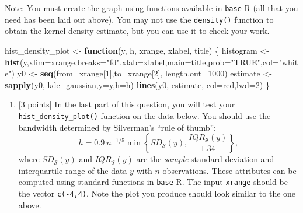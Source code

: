 \documentclass[
]{article}
\newenvironment{Shaded}{\begin{snugshade}}{\end{snugshade}}
\newcommand{\AttributeTok}[1]{\textcolor[rgb]{0.13,0.29,0.53}{#1}}
\newcommand{\ControlFlowTok}[1]{\textcolor[rgb]{0.13,0.29,0.53}{\textbf{#1}}}
\newcommand{\DecValTok}[1]{\textcolor[rgb]{0.00,0.00,0.81}{#1}}
\newcommand{\FunctionTok}[1]{\textcolor[rgb]{0.13,0.29,0.53}{\textbf{#1}}}
\newcommand{\NormalTok}[1]{#1}
\newcommand{\OtherTok}[1]{\textcolor[rgb]{0.56,0.35,0.01}{#1}}
\newcommand{\StringTok}[1]{\textcolor[rgb]{0.31,0.60,0.02}{#1}}
\providecommand{\tightlist}{%
  \setlength{\itemsep}{0pt}\setlength{\parskip}{0pt}}
\begin{document}
Note: You must create the graph using functions available in
\texttt{base} R (all that you need has been laid out above). You may not
use the \texttt{density()} function to obtain the kernel density
estimate, but you can use it to check your work.

\begin{Shaded}
\begin{Highlighting}[]
\NormalTok{hist\_density\_plot }\OtherTok{\textless{}{-}} \ControlFlowTok{function}\NormalTok{(y, h, xrange, xlabel, title) \{}
\NormalTok{  histogram }\OtherTok{\textless{}{-}} \FunctionTok{hist}\NormalTok{(y,}\AttributeTok{xlim=}\NormalTok{xrange,}\AttributeTok{breaks=}\StringTok{"fd"}\NormalTok{,}\AttributeTok{xlab=}\NormalTok{xlabel,}\AttributeTok{main=}\NormalTok{title,}\AttributeTok{prob=}\StringTok{"TRUE"}\NormalTok{,}\AttributeTok{col=}\StringTok{"white"}\NormalTok{)}
\NormalTok{  y0 }\OtherTok{\textless{}{-}} \FunctionTok{seq}\NormalTok{(}\AttributeTok{from=}\NormalTok{xrange[}\DecValTok{1}\NormalTok{],}\AttributeTok{to=}\NormalTok{xrange[}\DecValTok{2}\NormalTok{], }\AttributeTok{length.out=}\DecValTok{1000}\NormalTok{)}
\NormalTok{  estimate }\OtherTok{\textless{}{-}} \FunctionTok{sapply}\NormalTok{(y0, kde\_gaussian,}\AttributeTok{y=}\NormalTok{y,}\AttributeTok{h=}\NormalTok{h)}
  \FunctionTok{lines}\NormalTok{(y0, estimate, }\AttributeTok{col=}\StringTok{\textquotesingle{}red\textquotesingle{}}\NormalTok{,}\AttributeTok{lwd=}\DecValTok{2}\NormalTok{)}
\NormalTok{\}}
\end{Highlighting}
\end{Shaded}

\begin{enumerate}
\def\labelenumi{(\alph{enumi})}
\setcounter{enumi}{2}
\tightlist
\item
  {[}3 points{]} In the last part of this question, you will test your
  \texttt{hist\_density\_plot()} function on the data below. You should
  use the bandwidth determined by Silverman's ``rule of thumb'':
  \[h = 0.9~ n^{-1/5}\min \left\{SD_{\mathcal{S}}(y), \dfrac{IQR_{\mathcal{S}}(y)}{1.34} \right\},\]
  where \(SD_{\mathcal{S}}(y)\) and \(IQR_{\mathcal{S}}(y)\) are the
  \emph{sample} standard deviation and interquartile range of the data
  \(y\) with \(n\) observations. These attributes can be computed using
  standard functions in \texttt{base} R. The input \texttt{xrange}
  should be the vector \texttt{c(-4,4)}. Note the plot you produce
  should look similar to the one above.
\end{enumerate}
\end{document}

